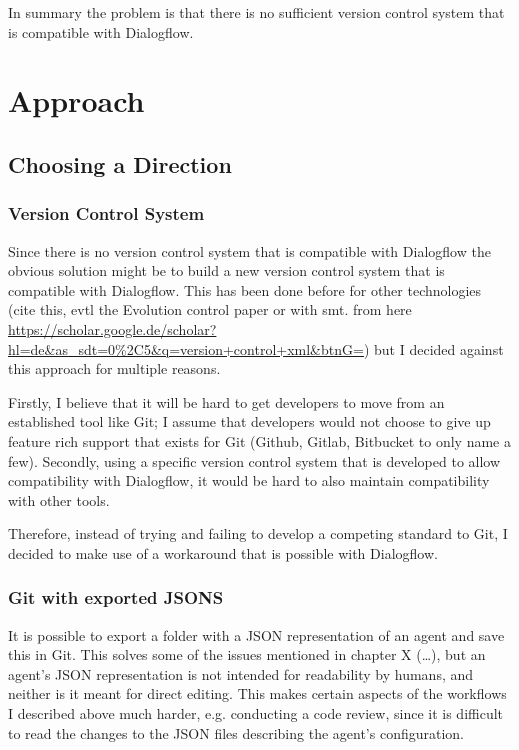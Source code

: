 In summary the problem is that there is no sufficient version control system that is compatible with Dialogflow.

\chapter{Approach}

\section{Choosing a Direction}

\subsection{Version Control System}

Since there is no version control system that is compatible with Dialogflow the obvious solution might be to build a new version control system that is compatible with Dialogflow. This has been done before for other technologies (cite this, evtl the Evolution control paper or with smt. from here \url{https://scholar.google.de/scholar?hl=de&as_sdt=0%2C5&q=version+control+xml&btnG=}) but I decided against this approach for multiple reasons.

Firstly, I believe that it will be hard to get developers to move from an established tool like Git; I assume that developers would not choose to give up feature rich support that exists for Git (Github, Gitlab, Bitbucket to only name a few).
Secondly, using a specific version control system that is developed to allow compatibility with Dialogflow, it would be hard to also maintain compatibility with other tools.

Therefore, instead of trying and failing to develop a competing standard to Git, I decided to make use of a workaround that is possible with Dialogflow.

\subsection{Git with exported JSONS}

It is possible to export a folder with a JSON representation of an agent and save this in Git. This solves some of the issues mentioned in chapter X (…), but an agent's JSON representation is not intended for readability by humans, and neither is it meant for direct editing. This makes certain aspects of the workflows I described above much harder, e.g. conducting a code review, since it is difficult to read the changes to the JSON files describing the agent’s configuration.

